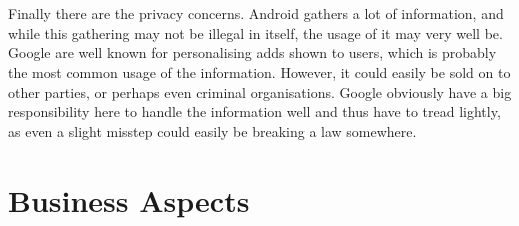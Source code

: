 \documentclass[conference]{IEEEtran}
\begin{document}
\\\\Finally there are the privacy concerns. Android gathers a lot of information, and while this gathering may not be illegal in itself, the usage of it may very well be. Google are well known for personalising adds shown to users, which is probably the most common usage of the information. However, it could easily be sold on to other parties, or perhaps even criminal organisations. Google obviously have a big responsibility here to handle the information well and thus have to tread lightly, as even a slight misstep could easily be breaking a law somewhere. 


\section{Business Aspects}
\label{financial}
\end{document}
